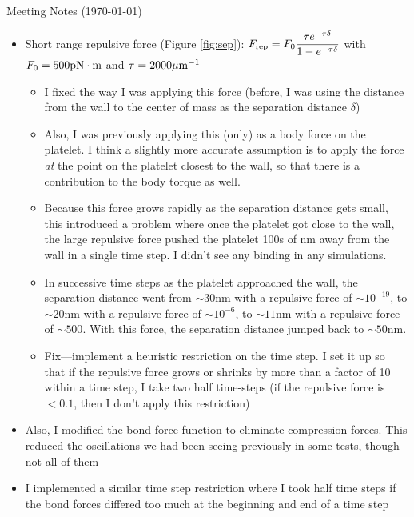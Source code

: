 \documentclass{article}
\newcommand{\tn}{\textnormal}
\begin{document}
\pagestyle{plain}

\begin{center}
  {\Large Meeting Notes (\today)}
\end{center}

\begin{itemize}
\item Short range repulsive force (Figure \ref{fig:sep}):
  $\displaystyle{F_\tn{rep} = F_0 \frac{\tau e^{-\tau \delta}}{1 -
      e^{-\tau \delta}}}$ with $F_0 = 500 \tn{pN} \cdot \tn{m}$ and
  $\tau = 2000 \mu\tn{m}^{-1}$
  \begin{itemize}
  \item I fixed the way I was applying this force (before, I was
    using the distance from the wall to the center of mass as the
    separation distance $\delta$)
  \item Also, I was previously applying this (only) as a body force on
    the platelet. I think a slightly more accurate assumption is to
    apply the force \emph{at} the point on the platelet closest to the
    wall, so that there is a contribution to the body torque as well.
  \item Because this force grows rapidly as the separation distance
    gets small, this introduced a problem where once the platelet got
    close to the wall, the large repulsive force pushed the platelet
    100s of nm away from the wall in a single time step. I didn't see
    any binding in any simulations.
  \item In successive time steps as the platelet approached the wall,
    the separation distance went from $\sim 30$nm with a repulsive
    force of $\sim 10^{-19}$, to $\sim 20$nm with a repulsive force of
    $\sim 10^{-6}$, to $\sim 11$nm with a repulsive force of
    $\sim 500$. With this force, the separation distance jumped back
    to $\sim 50$nm.
  \item Fix---implement a heuristic restriction on the time step. I
    set it up so that if the repulsive force grows or shrinks by more
    than a factor of 10 within a time step, I take two half
    time-steps (if the repulsive force is $< 0.1$, then I don't apply
    this restriction)
  \end{itemize}
\item Also, I modified the bond force function to eliminate
  compression forces. This reduced the oscillations we had been seeing
  previously in some tests, though not all of them
\item I implemented a similar time step restriction where I took half
  time steps if the bond forces differed too much at the beginning and
  end of a time step
\end{itemize}
\end{document}
